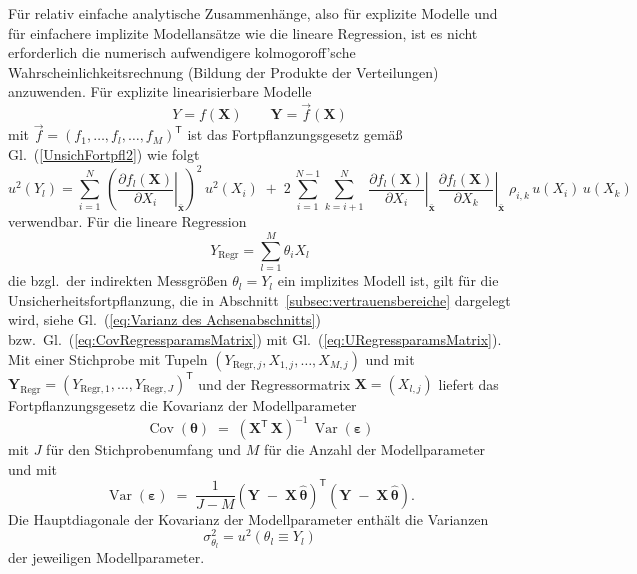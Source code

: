 Für relativ einfache analytische Zusammenhänge, also für explizite Modelle
und für ein\-fachere implizite Modellansätze wie die lineare Regression, ist
es nicht erforderlich die numerisch aufwendigere
kolmogoroff'sche Wahrscheinlichkeitsrechnung (Bildung
der Produkte der Verteilungen) anzuwenden.
Für explizite linearisierbare Modelle 
$$
Y = f(\mathbf{X}) \qquad \mathbf{Y} = \vec f(\mathbf{X})
$$
mit $\vec f = (f_1,\dots,f_l, \dots, f_M)^\mathsf{T}$ ist das 
Fortpflanzungsgesetz gemäß Gl.~(\ref{UnsichFortpfl2}) wie folgt
\begin{equation}
u^2(Y_l) = \sum\limits_{i=1}^{N} \, \left( \left. \frac{\partial f_l(\mathbf{X})}{\partial X_i}\right|_{\bar{\mathbf{x}}} \right)^2 \, u^2(X_i) \;  + \; 
2 \, \sum\limits_{i=1}^{{N-1}}
 \sum\limits_{k=i+1}^{N} \, \left. \frac{\partial f_l(\mathbf{X})}{\partial X_i}\right|_{\bar{\mathbf{x}}} \,
 \left. \frac{\partial f_l(\mathbf{X})}{\partial X_k}\right|_{\bar{\mathbf{x}}}  \; \rho_{i,k} \, u(X_i) \, u(X_k)
\end{equation}
verwendbar. Für die lineare Regression 
$$
Y_\mathrm{Regr} = \sum_{l=1}^M \theta_i X_l
$$
die bzgl.\ der indirekten Messgrößen $\theta_l = Y_l$ ein implizites Modell ist, gilt
für die Unsicherheitsfortpflanzung, die in Abschnitt~\ref{subsec:vertrauensbereiche}
dargelegt wird, siehe Gl.~(\ref{eq:Varianz des Achsenabschnitts}) bzw.\
Gl.~(\ref{eq:CovRegressparamsMatrix}) mit Gl.~(\ref{eq:URegressparamsMatrix}).
Mit einer Stichprobe mit Tupeln $(Y_{\mathrm{Regr},j}, X_{1,j},\dots,X_{M,j})$ und mit
$\boldsymbol Y_{\mathrm{Regr}} = (Y_{\mathrm{Regr},1},\dots,Y_{\mathrm{Regr},J})^{\mathsf{T}}$
und der Regressormatrix $\boldsymbol X = (X_{l,j})$ liefert das Fortpflanzungsgesetz die
Kovarianz der Modellparameter
\begin{equation}
\operatorname{Cov}(\boldsymbol \theta) \; = \; \left(\boldsymbol X^\mathsf{T} \, \boldsymbol X\right)^{-1} \, \operatorname{Var}(\boldsymbol \varepsilon)
\end{equation}
mit $J$ für den Stichprobenumfang und $M$ für die Anzahl der Modellparameter und mit
\begin{equation}
\operatorname{Var}(\boldsymbol \varepsilon) \; = \; 
	\frac{1}{J-M}\left(\boldsymbol Y \; - \; \boldsymbol X \, \hat{\boldsymbol \theta}\right)^\mathsf{T}
\left(\boldsymbol Y \; - \; \boldsymbol X \, \hat{\boldsymbol \theta}\right) .
\end{equation}
Die Hauptdiagonale der Kovarianz der Modellparameter enthält die Varianzen
$$
\sigma_{\theta_l}^2 = u^2(\theta_l\equiv Y_l)
$$
der jeweiligen Modellparameter.


